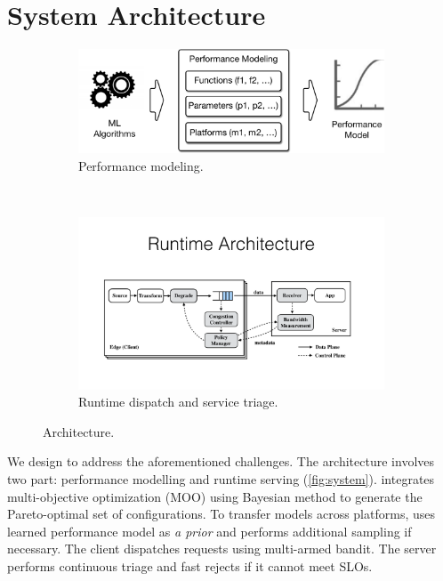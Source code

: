 \section{System Architecture}
\label{sec:sysname-design}

\begin{figure}
  \centering
  \begin{subfigure}[t]{0.9\columnwidth}
    \centering
    \includegraphics[width=0.9\columnwidth]{figures/offline.pdf}
    \caption{Performance modeling.}
  \end{subfigure}
  \\
  \vspace{1em}
  \begin{subfigure}[t]{0.8\columnwidth}
    \centering
    \includegraphics[width=\columnwidth]{figures/runtime.pdf}
    \caption{Runtime dispatch and service triage.}
  \end{subfigure}%
  \caption{\sysname{} Architecture.}
  \label{fig:system}
\end{figure}

We design \sysname{} to address the aforementioned challenges. The architecture
involves two part: performance modelling and runtime serving
(\autoref{fig:system}). \sysname{} integrates multi-objective optimization (MOO)
using Bayesian method to generate the Pareto-optimal set of configurations. To
transfer models across platforms, \sysname{} uses learned performance model as
\textit{a prior} and performs additional sampling if necessary. The client
dispatches requests using multi-armed bandit. The server performs continuous
triage and fast rejects if it cannot meet SLOs.

